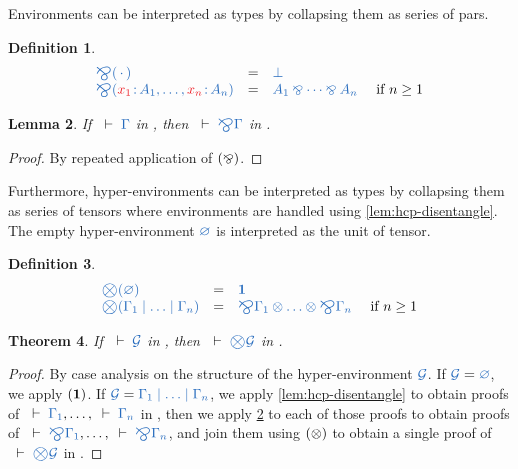\documentclass[submission,copyright,creativecommons]{eptcs}
\newtheorem{lemma}{Lemma}[section]
\newtheorem{theorem}[lemma]{Theorem}
\newtheorem{definition}[lemma]{Definition}
\begin{document}
Environments can be interpreted as types by collapsing them as series of pars.
\begin{definition}\label{def:bigparr}
  \[
  \begin{array}{lcll}
    \ty{\bigparr(\emptycontext)}
    & = & \ty{\bot}
    \\
    \ty{\bigparr(\tmty{x_1}{A_1} , \dots , \tmty{x_n}{A_n})} 
     & = & \ty{A_1 \parr \dots \parr A_n}
     & \text{ if } n \geq 1
    \\
  \end{array}
  \]
\end{definition}\noindent
\begin{lemma}\label{lem:cp-bigparr}
  If $\seq{\Gamma}$ in \cp, then $\seq{\bigparr\Gamma}$ in \cp.
\end{lemma} 
\begin{proof}
  By repeated application of $(\mathbin{\bindnasrepma})$.
\end{proof}\noindent
Furthermore, hyper-environments can be interpreted as types by collapsing them as series of tensors where environments are handled using \cref{lem:hcp-disentangle}. The empty hyper-environment $\ty{\emptyhypercontext}$ is interpreted as the unit of tensor.
\begin{definition}\label{def:bigtens}
  \[
  \begin{array}{lcll}
    \ty{\bigtens(\emptyhypercontext)}
    & = & \ty{\one}
    \\
    \ty{\bigtens(\Gamma_1 \hsep \dots \hsep \Gamma_n)}
    & = & \ty{\bigparr\Gamma_1 \tens \dots \tens \bigparr\Gamma_n}
    & \text{ if } n \geq 1
  \end{array}
  \]
\end{definition}\noindent

\begin{theorem}\label{thm:hcp2cp-bigtens}
  If $\seq{\mathcal{G}}$ in \hcp, then $\seq{\bigtens\mathcal{G}}$ in \cp.
\end{theorem} 
\begin{proof}
  By case analysis on the structure of the hyper-environment $\ty{\mathcal{G}}$.
  If $\ty{\mathcal{G}} = \ty{\emptyhypercontext}$, we apply $(\mathbf{1})$.
  If $\ty{\mathcal{G}} = \ty{\Gamma_1 \hsep \dots \hsep \Gamma_n}$, we apply \cref{lem:hcp-disentangle} to obtain proofs of $\seq{\Gamma_1}, \dots, \seq{\Gamma_n}$ in \cp, then we apply \cref{lem:cp-bigparr} to each of those proofs to obtain proofs of $\seq{\bigparr\Gamma_1}, \dots, \seq{\bigparr\Gamma_n}$, and join them using $(\otimes)$ to obtain a single proof of $\seq{\bigtens\mathcal{G}}$ in \cp.
\end{proof}\noindent
\end{document}
